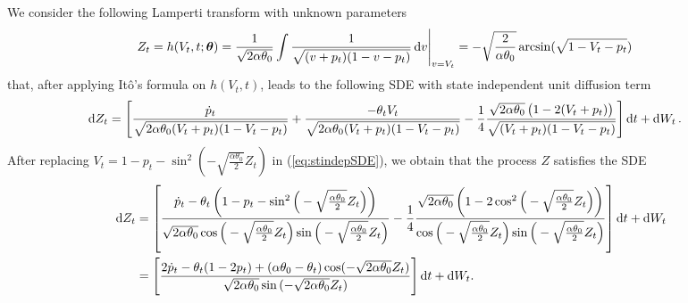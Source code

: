 \documentclass[11pt]{article}
\theoremstyle{definition}
\begin{document}
We consider the following Lamperti transform with unknown parameters
\begin{align}
Z_t = h(V_t, t; \bm{\theta} )  & = \frac{1}{\sqrt{2 \alpha \theta_0 }} \int \frac{1}{\sqrt{(v + p_t)(1 - v - p_t)}} \dif v \Bigg{\vert}_{v = V_t}   = - \sqrt{ \frac{2}{ \alpha \theta_0 }} \arcsin (\sqrt{ 1 - V_t - p_t}) \label{eq:LampZ}
\end{align}
that, after applying It\^{o}'s formula on $h(V_t, t)$, leads to the following SDE with state independent unit diffusion term
\begin{align}
\dif Z_t = \Bigg[  & \frac{\dot{p}_t}{ \sqrt{2 \alpha \theta_0 (V_t + p_t)(1 - V_t - p_t)}}  + \frac{- \theta_t V_t}{ \sqrt{2  \alpha \theta_0 (V_t + p_t)(1 - V_t - p_t)}} - \frac{1}{4} \frac{\sqrt{2 \alpha \theta_0} \left( 1 - 2 (V_t + p_t)\right)}{\sqrt{(V_t + p_t)(1 - V_t - p_t)}}  \Bigg] \dif t + \dif W_t \,. \label{eq:stindepSDE}
\end{align}
After replacing $V_t = 1 - p_t - \sin^2 \left(- \sqrt{ \frac{ \alpha \theta_0}{2} } Z_t \right) $ in (\ref{eq:stindepSDE}), we obtain that the  process $Z$ satisfies the SDE
\begin{align}
\dif Z_t & = \left[ \frac{ \dot{p}_t  - \theta_t  \left(1 - p_t - \sin^2 \Big(- \sqrt{ \frac{ \alpha \theta_0}{2} } Z_t \Big) \right) }{\sqrt{2 \alpha \theta_0} \cos\Big(- \sqrt{ \frac{ \alpha \theta_0}{2} } Z_t \Big)  \sin\Big(- \sqrt{ \frac{ \alpha \theta_0}{2} } Z_t \Big)}   - \frac{1}{4}  \frac{\sqrt{2 \alpha \theta_0} \left(1 - 2 \cos^2 \Big(- \sqrt{ \frac{ \alpha \theta_0}{2} } Z_t \Big) \right) }{\cos\Big(- \sqrt{ \frac{ \alpha \theta_0}{2} } Z_t \Big)  \sin\Big(- \sqrt{ \frac{ \alpha \theta_0}{2} } Z_t \Big)} \right]\dif t + \dif W_t \nonumber \\
&  = \left[  \frac{  2  \dot{p}_t - \theta_t (1 - 2 p_t)  + (\alpha \theta_0 - \theta_t) \cos(- \sqrt{2 \alpha \theta_0 } Z_t) }{\sqrt{2 \alpha \theta_0} \sin{(- \sqrt{2 \alpha \theta_0} Z_t)}}  \right] \dif t + \dif W_t.  \label{eq:stindepSDE2}
\end{align}
\end{document}
